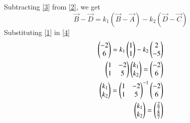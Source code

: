\documentclass[journal,12pt,twocolumn]{IEEEtran}
\begin{document}
Subtracting \eqref{3} from \eqref{2}, we get
\begin{equation}
\vec{B} - \vec{D} = k_1(\vec{B} - \vec{A})-k_2(\vec{D} - \vec{C}) \label{4}    
\end{equation}
Substituting \eqref{1} in \eqref{4}
\begin{align}
\begin{pmatrix}-2\\ 6\end{pmatrix} = k_1\begin{pmatrix}1 \\ 1\end{pmatrix}- k_2\begin{pmatrix}2\\ -5\end{pmatrix} \label{5} \\
\begin{pmatrix}1 & -2 \\ 1 & 5\end{pmatrix} \begin{pmatrix}k_1\\k_2\end{pmatrix} = \begin{pmatrix}-2\\6\end{pmatrix} \label{6} \\ 
\begin{pmatrix}k_1\\k_2\end{pmatrix} = \begin{pmatrix}1 & -2 \\ 1 & 5\end{pmatrix}^{-1}\begin{pmatrix}-2\\6\end{pmatrix} \\
\begin{pmatrix}k_1\\k_2\end{pmatrix} = \begin{pmatrix}\frac{2}{7}\\ \frac{8}{7}\end{pmatrix} \label{8}  
\end{align}
 
\end{document}
